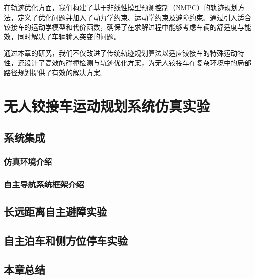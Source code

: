 \documentclass[master,academic]{ysuthesis} %
\begin{document}
	在轨迹优化方面，我们构建了基于非线性模型预测控制（NMPC）的轨迹规划方法，定义了优化问题并加入了动力学约束、运动学约束及避障约束。通过引入适合铰接车的运动学模型和代价函数，确保了在求解过程中能够考虑车辆的舒适度与能效，同时解决了车辆输入突变的问题。

	通过本章的研究，我们不仅改进了传统轨迹规划算法以适应铰接车的特殊运动特性，还设计了高效的碰撞检测与轨迹优化方案，为无人铰接车在复杂环境中的局部路径规划提供了有效的解决方案。
	
	\chapter{无人铰接车运动规划系统仿真实验}
	\section{系统集成}
		\subsection{仿真环境介绍}
		\subsection{自主导航系统框架介绍}
	\section{长远距离自主避障实验}
	\section{自主泊车和侧方位停车实验}
	\section{本章总结}


\end{document}
